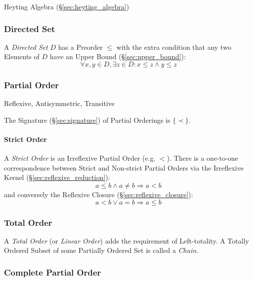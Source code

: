 Heyting Algebra (\S\ref{sec:heyting_algebra})



\subsubsection{Directed Set}\label{sec:directed_set}

A \emph{Directed Set} $D$ has a Preorder $\leq$ with the extra
condition that any two Elements of $D$ have an Upper Bound
(\S\ref{sec:upper_bound}):
\[
  \forall x, y \in D, \exists z \in D : x \leq z \wedge y \leq z
\]



\subsubsection{Partial Order}\label{sec:partial_order}

Reflexive, Antisymmetric, Transitive

The Signature (\S\ref{sec:signature}) of Partial Orderings is
$\{\prec\}$.



\paragraph{Strict Order}\label{sec:strict_order}

A \emph{Strict Order} is an Irreflexive Partial Order (e.g. $<$).
There is a one-to-one correspondence between Strict and Non-strict
Partial Orders via the Irreflexive Kernel
(\S\ref{sec:reflexive_reduction}):
\[
  a \leq b \wedge a \neq b \Rightarrow a < b
\]
and conversely the Reflexive Closure (\S\ref{sec:reflexive_closure}):
\[
  a < b \vee a = b \Rightarrow a \leq b
\]



\subsubsection{Total Order}\label{sec:total_order}

A \emph{Total Order} (or \emph{Linear Order}) adds the requirement of
Left-totality. A Totally Ordered Subset of some Partially Ordered Set
is called a \emph{Chain}.



\subsubsection{Complete Partial Order}\label{sec:complete_partialorder}

